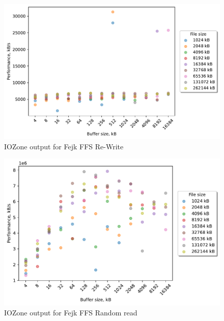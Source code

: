 \begin{figure}[!htb]
	\label{fig:bench_fffs_re_write}
	\begin{center}
		\includegraphics[width=1.0\textwidth]{figures.nosync/benchmarking/fejk-ffs/Re-Write.pdf}
	\end{center}
	\caption{IOZone output for Fejk FFS \mbox{Re-Write}}
\end{figure}

\begin{figure}[!htb]
	\label{fig:bench_fffs_rnd_read}
	\begin{center}
		\includegraphics[width=1.0\textwidth]{figures.nosync/benchmarking/fejk-ffs/Random read.pdf}
	\end{center}
	\caption{IOZone output for Fejk FFS Random read}
\end{figure}

